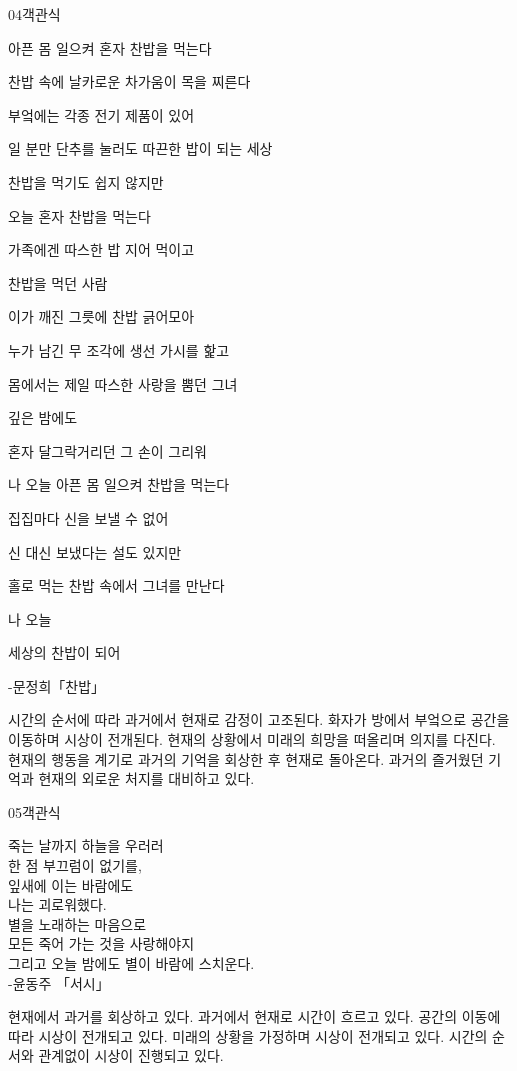 \documentclass[fs9,seriesRus]{korfarm-base}
\begin{document}
\begin{kfQBlock}{04}{객관식}
\begin{kfEvidence}아픈 몸 일으켜 혼자 찬밥을 먹는다

찬밥 속에 날카로운 차가움이 목을 찌른다

부엌에는 각종 전기 제품이 있어

일 분만 단추를 눌러도 따끈한 밥이 되는 세상

찬밥을 먹기도 쉽지 않지만

오늘 혼자 찬밥을 먹는다

가족에겐 따스한 밥 지어 먹이고

찬밥을 먹던 사람

이가 깨진 그릇에 찬밥 긁어모아

누가 남긴 무 조각에 생선 가시를 핥고

몸에서는 제일 따스한 사랑을 뿜던 그녀

깊은 밤에도

혼자 달그락거리던 그 손이 그리워

나 오늘 아픈 몸 일으켜 찬밥을 먹는다

집집마다 신을 보낼 수 없어

신 대신 보냈다는 설도 있지만

홀로 먹는 찬밥 속에서 그녀를 만난다

나 오늘

세상의 찬밥이 되어

-문정희「찬밥」\end{kfEvidence}
\begin{kfChoices}
\kfChoice 시간의 순서에 따라 과거에서 현재로 감정이 고조된다.
\kfChoice 화자가 방에서 부엌으로 공간을 이동하며 시상이 전개된다.
\kfChoice 현재의 상황에서 미래의 희망을 떠올리며 의지를 다진다.
\kfChoice 현재의 행동을 계기로 과거의 기억을 회상한 후 현재로 돌아온다.
\kfChoice 과거의 즐거웠던 기억과 현재의 외로운 처지를 대비하고 있다.
\end{kfChoices}
\end{kfQBlock}
\begin{kfQBlock}{05}{객관식}
\begin{kfEvidence}죽는 날까지 하늘을 우러러   \\\relax
   한 점 부끄럼이 없기를,   \\\relax
   잎새에 이는 바람에도   \\\relax
   나는 괴로워했다.   \\\relax
   별을 노래하는 마음으로   \\\relax
   모든 죽어 가는 것을 사랑해야지   \\\relax
   그리고 오늘 밤에도 별이 바람에 스치운다.   \\\relax
   -윤동주 「서시」\end{kfEvidence}
\begin{kfChoices}
\kfChoice 현재에서 과거를 회상하고 있다.
\kfChoice 과거에서 현재로 시간이 흐르고 있다.
\kfChoice 공간의 이동에 따라 시상이 전개되고 있다.
\kfChoice 미래의 상황을 가정하며 시상이 전개되고 있다.
\kfChoice 시간의 순서와 관계없이 시상이 진행되고 있다.
\end{kfChoices}
\end{kfQBlock}
\end{document}
